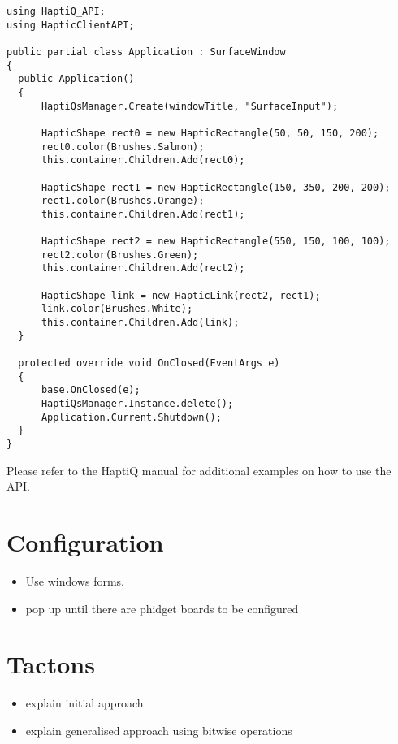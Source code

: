 \lstset{style=sharpc}
\begin{lstlisting}[caption={Basic API usage},label={lst:basicAPIUsage}]
using HaptiQ_API;
using HapticClientAPI;

public partial class Application : SurfaceWindow
{
  public Application()
  {
      HaptiQsManager.Create(windowTitle, "SurfaceInput");
      
      HapticShape rect0 = new HapticRectangle(50, 50, 150, 200);
      rect0.color(Brushes.Salmon);
      this.container.Children.Add(rect0);
      
      HapticShape rect1 = new HapticRectangle(150, 350, 200, 200);
      rect1.color(Brushes.Orange);
      this.container.Children.Add(rect1);
      
      HapticShape rect2 = new HapticRectangle(550, 150, 100, 100);
      rect2.color(Brushes.Green);
      this.container.Children.Add(rect2);
      
      HapticShape link = new HapticLink(rect2, rect1);
      link.color(Brushes.White);
      this.container.Children.Add(link);
  }
  
  protected override void OnClosed(EventArgs e)
  {
      base.OnClosed(e);
      HaptiQsManager.Instance.delete();
      Application.Current.Shutdown();
  }
}
\end{lstlisting}


Please refer to the HaptiQ manual for additional examples on how to use the API. 

\section{Configuration}

\begin{itemize}
\item Use windows forms.
\item pop up until there are phidget boards to be configured
\end{itemize}

\section{Tactons}

\begin{itemize}
\item explain initial approach
\item explain generalised approach using bitwise operations
\end{itemize}

